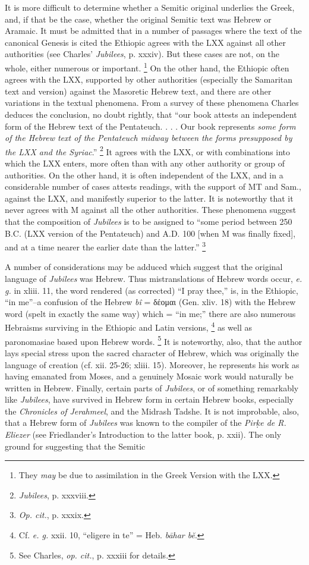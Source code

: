 It is more difficult to determine whether a Semitic original underlies the Greek, and, if that be the case, whether the original Semitic text was Hebrew or Aramaic. It must be admitted that in a number of passages where the text of the canonical Genesis is cited the Ethiopic agrees with the LXX against all other authorities (see Charles' \emph{Jubilees}, p. xxxiv). But these cases are not, on the whole, either numerous or important. \footnote{They \emph{may} be due to assimilation in the Greek Version with the LXX.} On the other hand, the Ethiopic often agrees with the LXX, supported by other authorities (especially the Samaritan text and version) against the Masoretic Hebrew text, and there are other variations in the textual phenomena. From a survey of these phenomena Charles deduces the conclusion, no doubt rightly, that ``our book attests an independent form of the Hebrew text of the Pentateuch. . . . Our book represents \emph{some form of the Hebrew text of the Pentateuch midway between the forms presupposed by the LXX and the Syriac}.'' \footnote{\emph{Jubilees}, p. xxxviii.} It agrees with the LXX, or with combinations into which the LXX enters, more often than with any other authority or group of authorities. On the other hand, it is often independent of the LXX, and in a considerable number of cases attests readings, with the support of MT and Sam., against the LXX, and manifestly superior to the latter. It is noteworthy that it never agrees with M against all the other authorities. These phenomena suggest that the composition of \emph{Jubilees} is to be assigned to ``some period between 250 B.C. (LXX version of the Pentateuch) and A.D. 100 [when M was finally fixed], and at a time nearer the earlier date than the latter.'' \footnote{\emph{Op. cit.}, p. xxxix.}

A number of considerations may be adduced which suggest that the original language of \emph{Jubilees} was Hebrew. Thus mistranslations of Hebrew words occur, \emph{e. g.} in xliii. 11, the word rendered (as corrected) ``I pray thee,'' is, in the Ethiopic, ``in me''--a confusion of the Hebrew \emph{bî} = \textgreek{δέομαι} (Gen. xliv. 18) with the Hebrew word (spelt in exactly the same way) which = ``in me;'' there are also numerous Hebraisms surviving in the Ethiopic and Latin versions, \footnote{Cf. \emph{e. g.} xxii. 10, ``eligere in te'' = Heb. \emph{bāhar bĕ}.} as well as paronomasiae based upon Hebrew words. \footnote{See Charles, \emph{op. cit.}, p. xxxiii for details.} It is noteworthy, also, that the author lays special stress upon the sacred character of Hebrew, which was originally the language of creation (cf. xii. 25-26; xliii. 15). Moreover, he represents his work as having emanated from Moses, and a genuinely Mosaic work would naturally be written in Hebrew. Finally, certain parts of \emph{Jubilees}, or of something remarkably like \emph{Jubilees}, have survived in Hebrew form in certain Hebrew books, especially the \emph{Chronicles of Jerahmeel}, and the Midrash Tadshe. It is not improbable, also, that a Hebrew form of \emph{Jubilees} was known to the compiler of the \emph{Pir\d{k}e de R. Eliezer} (see Friedlander's Introduction to the latter book, p. xxii). The only ground for suggesting that the Semitic

